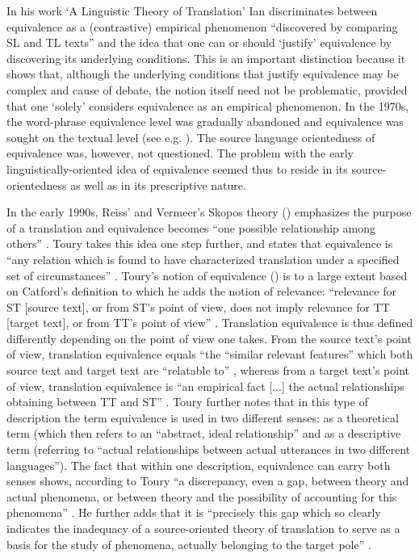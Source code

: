 In his work ‘A Linguistic Theory of Translation’ Ian \citet{catford_linguistic_1965} discriminates between equivalence as a (contrastive) empirical phenomenon “discovered by comparing SL and TL texts” \citep[27]{catford_linguistic_1965} and the idea that one can or should ‘justify’ equivalence by discovering its underlying conditions. This is an important distinction because it shows that, although the underlying conditions that justify equivalence may be complex and cause of debate, the notion itself need not be problematic, provided that one ‘solely’ considers equivalence as an empirical phenomenon. In the 1970s, the word-phrase equivalence level was gradually abandoned and equivalence was sought on the textual level (see e.g. \citealt{koller_einfuhrung_1979}). The source language orientedness of equivalence was, however, not questioned. The problem with the early linguistically-oriented idea of equivalence seemed thus to reside in its source-orientedness as well as in its prescriptive nature.

In the early 1990s, Reiss’ and Vermeer’s Skopos theory (\citeyear{reiss_grundlegung_1991}) emphasizes the purpose of a translation and equivalence becomes “one possible relationship among others” \citep[5]{schaffner_concept_1999}. Toury takes this idea one step further, and states that equivalence is “any relation which is found to have characterized translation under a specified set of circumstances” \citep[61]{toury_descriptive_1995}. Toury’s notion of equivalence (\citeyear[37 ff.]{toury_search_1980}) is to a large extent based on Catford’s definition to which he adds the notion of relevance: “relevance for ST [source text], or from ST’s point of view, does not imply relevance for TT [target text], or from TT’s point of view” \citep[11]{toury_search_1980}. Translation equivalence is thus defined differently depending on the point of view one takes. From the source text’s point of view, translation equivalence equals “the “similar relevant features” which both source text and target text are “relatable to” \citep[38]{toury_search_1980}, whereas from a target text’s point of view, translation equivalence is “an empirical fact [...] the actual relationships obtaining between TT and ST” \citep[39]{toury_search_1980}. Toury further notes that in this type of description the term equivalence is used in two different senses: as a theoretical term (which then refers to an “abstract, ideal relationship” and as a descriptive term (referring to “actual relationships between actual utterances in two different languages”). The fact that within one description, equivalence can carry both senses shows, according to Toury “a discrepancy, even a gap, between theory and actual phenomena, or between theory and the possibility of accounting for this phenomena” \citep[39]{toury_search_1980}. He further adds that it is “precisely this gap which so clearly indicates the inadequacy of a source-oriented theory of translation to serve as a basis for the study of phenomena, actually belonging to the target pole” \citep[39]{toury_search_1980}.

